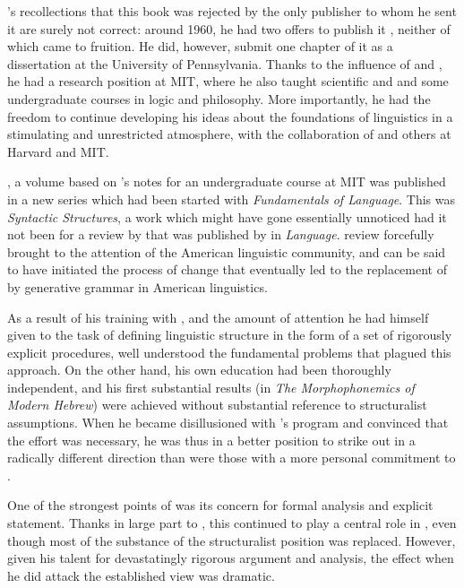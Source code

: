 {\Chomsky}'s recollections that this book was rejected by the only
publisher to whom he sent it are surely not correct: around 1960, he
had two offers to publish it \citep[sec. 4.5]{newmeyer22:ailt},
neither of which came to fruition. He did, however, submit one chapter
of it as a dissertation at the University of Pennsylvania. Thanks to
the influence of {\Halle} and {\Jakobson}, he had a research position at
MIT, where he also taught scientific  and  and some
undergraduate courses in logic and philosophy. More importantly, he
had the freedom to continue developing his ideas about the foundations
of linguistics in a stimulating and unrestricted atmosphere, with the
collaboration of {\Halle} and others at Harvard and MIT.

\citealt{chomsky57:ss}, a volume based on {\Chomsky}'s notes for an
undergraduate course at MIT \citep[as it is described in]
[63]{chomsky82:generative.enterprise} was published in a new series
which had been started with 
\textsl{Fundamentals of Language}. This was \textsl{Syntactic
  Structures}, a work which might have gone essentially unnoticed had
it not been for a review by  that was published by {\Bloch} in
\textsl{Language}.  review forcefully brought
 to the attention of the American linguistic
community, and can be said to have initiated the process of change
that eventually led to the replacement of  by generative
grammar in American linguistics.

As a result of his training with {\Harris}, and the amount of attention
he had himself given to the task of defining linguistic structure in
the form of a set of rigorously explicit procedures, {\Chomsky} well
understood the fundamental problems that plagued this approach. On the
other hand, his own education had been thoroughly independent, and his
first substantial results (in \textsl{The Morphophonemics of Modern
  Hebrew}) were achieved without substantial reference to
structuralist assumptions. When he became disillusioned with {\Harris}'s
program and convinced that the effort was necessary, he was thus in a
better position to strike out in a radically different direction than
were those with a more personal commitment to .

One of the strongest points of  was its concern
for formal analysis and explicit statement. Thanks in large part to
{\Chomsky}, this continued to play a central role in ,
even though most of the substance of the structuralist position was
replaced. However, given his talent for devastatingly rigorous
argument and analysis, the effect when he did attack the established
view was dramatic.

